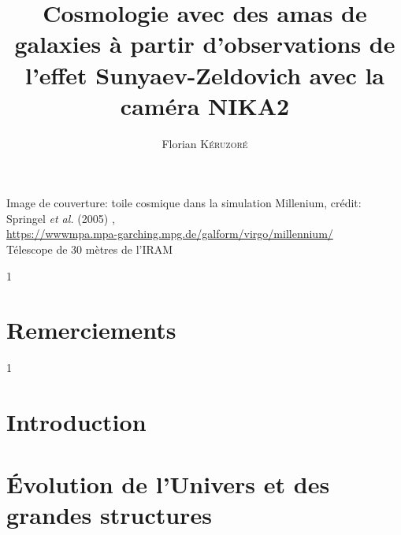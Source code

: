 \documentclass[a4paper, 12pt, twoside]{book}
\title{Cosmologie avec des amas de galaxies à partir d'observations de l'effet Sunyaev-Zeldovich avec la caméra NIKA2}
\author{Florian \textsc{K\'eruzor\'e}}
\date{}
\def\printerversion{0} %
\begin{document}
\begin{titlepage}
    
\end{titlepage}

\phantom{ }
\vfill
{\footnotesize \noindent
    Image de couverture: toile cosmique dans la simulation Millenium,
    crédit: Springel \textit{et al.} (2005) \cite{springel_simulations_2005}, \\
    \url{https://wwwmpa.mpa-garching.mpg.de/galform/virgo/millennium/} \\
    Télescope de 30 mètres de l'IRAM
}


\setlength{\parskip}{3pt}
\dominitoc[n]
\tableofcontents
\setlength{\parskip}{5pt}


\if\printerversion1
    \afterpage{\null \thispagestyle{empty} \newpage}
    \afterpage{\null \thispagestyle{empty} \newpage}
\fi
\chapter*{Remerciements}

\adjustmtc

\if\printerversion1
    \afterpage{\null \thispagestyle{empty} \newpage}
    \afterpage{\null \thispagestyle{empty} \newpage}
\fi
\chapter*{Introduction}
\label{chap:intro}


\chapter{Évolution de l'Univers et des grandes structures}
\label{chap:cosmo1}
\minitoc


\end{document}

